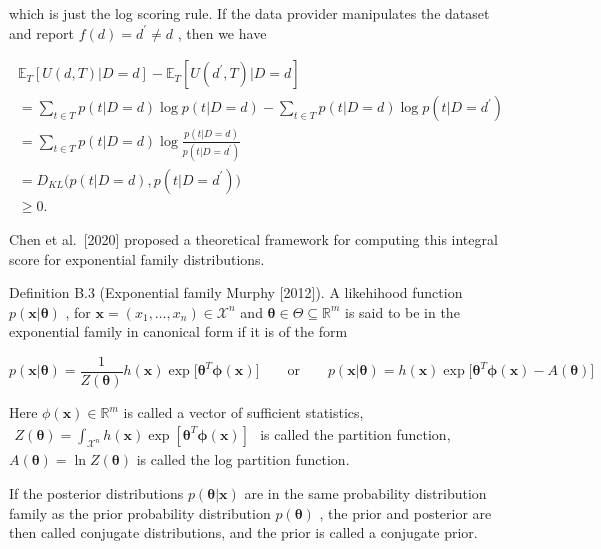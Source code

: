 which is just the log scoring rule. If the data provider manipulates the
dataset and report \(f ( d ) = d ^ { \prime } \neq d\) , then we have

\[
\begin{array} { l } { \displaystyle \mathbb { E } _ { T } [ U ( d , T ) | D = d ] - \mathbb { E } _ { T } [ U ( d ^ { \prime } , T ) | D = d ] } \\ { \displaystyle = \sum _ { t \in T } p ( t | D = d ) \log p ( t | D = d ) - \sum _ { t \in T } p ( t | D = d ) \log p ( t | D = d ^ { \prime } ) } \\ { \displaystyle = \sum _ { t \in T } p ( t | D = d ) \log \frac { p ( t | D = d ) } { p ( t | D = d ^ { \prime } ) } } \\ { \displaystyle = D _ { K L } \big ( p ( t | D = d ) , p ( t | D = d ^ { \prime } ) \big ) } \\ { \displaystyle \geq 0 . } \end{array}
\]

Chen et al.~{[}2020{]} proposed a theoretical framework for computing
this integral score for exponential family distributions.

Definition B.3 (Exponential family Murphy {[}2012{]}). A likehihood
function \(p ( \mathbf { x } | \mathbf { \theta } )\) , for
\(\mathbf { x } = ( x _ { 1 } , \ldots , x _ { n } ) \in { \mathcal { X } } ^ { n }\)
and \(\pmb { \theta } \in \Theta \subseteq \mathbb { R } ^ { m }\) is
said to be in the exponential family in canonical form if it is of the
form

\[
p ( \mathbf { x } | \pmb { \theta } ) = \frac { 1 } { Z ( \pmb { \theta } ) } h ( \mathbf { x } ) \exp \big [ \pmb { \theta } ^ { T } \pmb { \phi } ( \mathbf { x } ) \big ] \qquad \mathrm { o r } \qquad p ( \mathbf { x } | \pmb { \theta } ) = h ( \mathbf { x } ) \exp \big [ \pmb { \theta } ^ { T } \pmb { \phi } ( \mathbf { x } ) - A ( \pmb { \theta } ) \big ]
\]

Here \(\phi ( \boldsymbol { x } ) \in \mathbb { R } ^ { m }\) is called
a vector of sufficient statistics,
\(\begin{array} { r } { Z ( \pmb \theta ) = \int _ { \mathcal { X } ^ { n } } h ( \mathbf x ) \exp \left[ \pmb \theta ^ { T } \pmb \phi ( \mathbf x ) \right] } \end{array}\)
is called the partition function,
\(A ( \pmb \theta ) = \ln Z ( \pmb \theta )\) is called the log
partition function.

If the posterior distributions \(p ( \pmb \theta | \mathbf x )\) are in
the same probability distribution family as the prior probability
distribution \(p ( \pmb \theta )\) , the prior and posterior are then
called conjugate distributions, and the prior is called a conjugate
prior.

